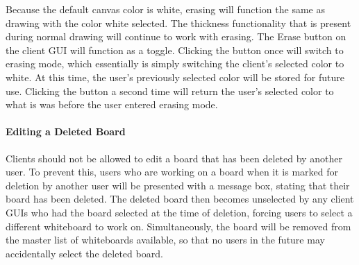 Because the default canvas color is white, erasing will function the same as drawing with the color white selected.  The thickness functionality that is present during normal drawing will continue to work with erasing. The Erase button on the client GUI will function as a toggle. Clicking the button once will switch to erasing mode, which essentially is simply switching the client's selected color to white. At this time, the user's previously selected color will be stored for future use. Clicking the button a second time will return the user's selected color to what is was before the user entered erasing mode.

\paragraph{Editing a Deleted Board}

Clients should not be allowed to edit a board that has been deleted by another user. To prevent this, users who are working on a board when it is marked for deletion by another user will be presented with a message box, stating that their board has been deleted.  The deleted board then becomes unselected by any client GUIs who had the board selected at the time of deletion, forcing users to select a different whiteboard to work on. Simultaneously, the board will be removed from the master list of whiteboards available, so that no users in the future may accidentally select the deleted board.